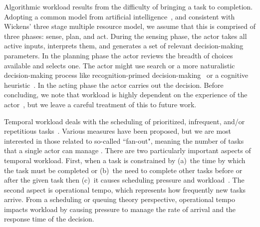 Algorithmic workload results from the difficulty of bringing a task to completion. Adopting a common model from artificial intelligence~\cite{Murphy00}, and consistent with Wickens' three stage multiple resource model, we assume that this is comprised of three phases: sense, plan, and act. During the sensing phase, the actor takes all active inputs, interprets them, and generates a set of relevant decision-making parameters. In the planning phase the actor reviews the breadth of choices available and selects one. The actor might use search or a more naturalistic decision-making process like recognition-primed decision-making~\cite{ZsambokKlein97} or a cognitive heuristic~\cite{GigerenzerTodd99}. In the acting phase the actor carries out the decision. Before concluding, we note that workload is highly dependent on the experience of the actor~\cite{ZsambokKlein97}, but we leave a careful treatment of this to future work.

Temporal workload deals with the scheduling of prioritized, infrequent, and/or repetitious tasks~\cite{DessoukyEtAl95,MorayEtAl91}. Various measures have been proposed, but we are most interested in those related to so-called ``fan-out", meaning the number of tasks that a single actor can manage \cite{Goodrich2010,OlsenWood2004,CrandallEtAl2005,Cummings2007}. There are two particularly important aspects of temporal workload. First, when a task is constrained by (a)~the time by which the task must be completed or (b)~the need to complete other tasks before or after the given task then (c)~it causes scheduling pressure and workload~\cite{MauDolan2006}. The second aspect is operational tempo, which represents how frequently new tasks arrive.  From a scheduling or queuing theory perspective, operational tempo impacts workload by causing pressure to manage the rate of arrival and the response time of the decision.

